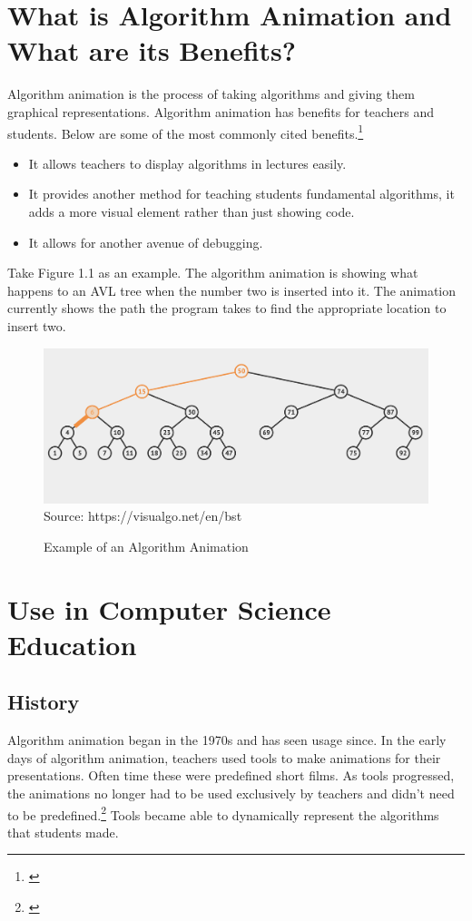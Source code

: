 \documentclass[12pt,twoside]{reedthesis}
\begin{document}
\section{What is Algorithm Animation and What are its Benefits?}	
Algorithm animation is the process of taking algorithms and giving them graphical representations. Algorithm animation has benefits for teachers and students. Below are some of the most commonly cited benefits.\footnote{\cite{hundhausen_meta-study_2002}}
\begin{itemize}
\item It allows teachers to display algorithms in lectures easily.
\item It provides another method for teaching students fundamental algorithms, it adds a more visual element rather than just showing code. 
\item It allows for another avenue of debugging. 
\end{itemize}
Take Figure 1.1 as an example. The algorithm animation is showing what happens to an AVL tree when the number two is inserted into it. The animation currently shows the path the program takes to find the appropriate location to insert two. 
\begin{figure}[htbp] 
\begin{centering} 
\caption{Example of an Algorithm Animation}
\includegraphics[scale=0.462] {animexample}
\footnotesize{Source: https://visualgo.net/en/bst}
\label{animexample}
\end{centering} 
\end{figure}


\section{Use in Computer Science Education}

\subsection{History}
Algorithm animation began in the 1970s and has seen usage since. In the early days of algorithm animation, teachers used tools to make animations for their presentations. Often time these were predefined short films. As tools progressed, the animations no longer had to be used exclusively by teachers and didn't need to be predefined.\footnote{\cite{hundhausen_meta-study_2002}} Tools became able to dynamically represent the algorithms that students made. 
\end{document}
